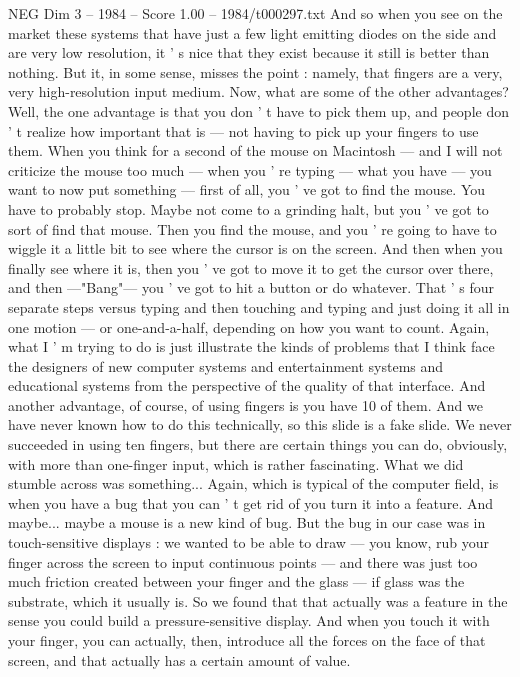 \begin{textsample}{NEG Dim 3 – 1984 – Score 1.00 – 1984/t000297.txt}
And so when you see on the market these systems that have just a few light emitting diodes on the side and are very low resolution, it ' s nice that they exist because it still is better than nothing.
But it, in some sense, misses the point : namely, that fingers are a very, very high-resolution input medium.
Now, what are some of the other advantages?
Well, the one advantage is that you don ' t have to pick them up, and people don ' t realize how important that is — not having to pick up your fingers to use them.
When you think for a second of the mouse on Macintosh — and I will not criticize the mouse too much — when you ' re typing — what you have — you want to now put something — first of all, you ' ve got to find the mouse.
You have to probably stop.
Maybe not come to a grinding halt, but you ' ve got to sort of find that mouse.
Then you find the mouse, and you ' re going to have to wiggle it a little bit to see where the cursor is on the screen.
And then when you finally see where it is, then you ' ve got to move it to get the cursor over there, and then —"Bang"— you ' ve got to hit a button or do whatever.
That ' s four separate steps versus typing and then touching and typing and just doing it all in one motion — or one-and-a-half, depending on how you want to count.
Again, what I ' m trying to do is just illustrate the kinds of problems that I think face the designers of new computer systems and entertainment systems and educational systems from the perspective of the quality of that interface.
And another advantage, of course, of using fingers is you have 10 of them.
And we have never known how to do this technically, so this slide is a fake slide.
We never succeeded in using ten fingers, but there are certain things you can do, obviously, with more than one-finger input, which is rather fascinating.
What we did stumble across was something...
Again, which is typical of the computer field, is when you have a bug that you can ' t get rid of you turn it into a feature.
And maybe... maybe a mouse is a new kind of bug.
But the bug in our case was in touch-sensitive displays : we wanted to be able to draw — you know, rub your finger across the screen to input continuous points — and there was just too much friction created between your finger and the glass — if glass was the substrate, which it usually is.
So we found that that actually was a feature in the sense you could build a pressure-sensitive display.
And when you touch it with your finger, you can actually, then, introduce all the forces on the face of that screen, and that actually has a certain amount of value.

\end{textsample}
